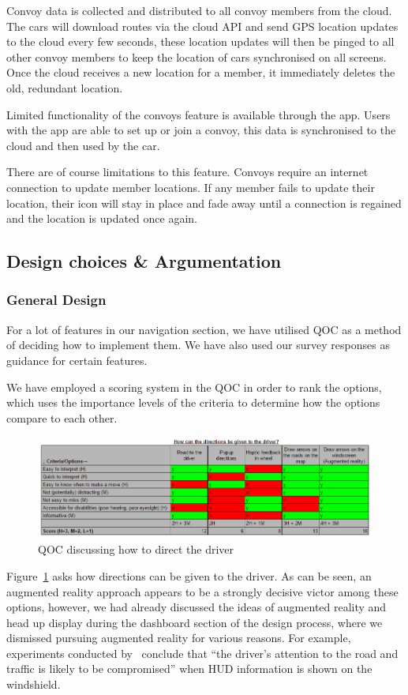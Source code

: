 \documentclass{article}
\begin{document}
Convoy data is collected and distributed to all convoy members from the cloud. The cars will download routes via the cloud API and send GPS location updates to the cloud every few seconds, these location updates will then be pinged to all other convoy members to keep the location of cars synchronised on all screens. Once the cloud receives a new location for a member, it immediately deletes the old, redundant location.

Limited functionality of the convoys feature is available through the app. Users with the app are able to set up or join a convoy, this data is synchronised to the cloud and then used by the car.

There are of course limitations to this feature. Convoys require an internet connection to update member locations. If any member fails to update their location, their icon will stay in place and fade away until a connection is regained and the location is updated once again.

\subsection{Design choices \& Argumentation}\label{ssec:nav-design}
\subsubsection{General Design}\label{sssec:nav-design-general}
For a lot of features in our navigation section, we have utilised QOC as a method of deciding how to implement them. We have also used our survey responses as guidance for certain features.

We have employed a scoring system in the QOC in order to rank the options, which uses the importance levels of the criteria to determine how the options compare to each other.

\begin{figure}[H]
  \centering
  \includegraphics[width=\linewidth]{qoc-nav-instruction}
  \caption{QOC discussing how to direct the driver}\label{qoc-instructions}
\end{figure}
Figure~\ref{qoc-instructions} asks how directions can be given to the driver. As can be seen, an augmented reality approach appears to be a strongly decisive victor among these options, however, we had already discussed the ideas of augmented reality and head up display during the dashboard section of the design process, where we dismissed pursuing augmented reality for various reasons. For example, experiments conducted by~\textcite{augmented-reality} conclude that ``the driver's attention to the road and traffic is likely to be compromised'' when HUD information is shown on the windshield. 
\end{document}
